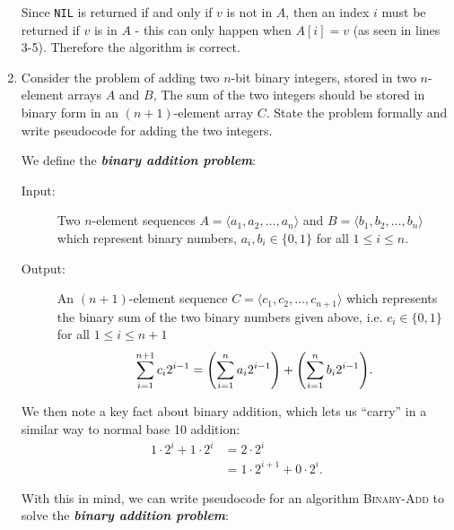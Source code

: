\documentclass[Chapter02]{subfiles}
\begin{document}
\begin{enumerate}
\begin{answer}
			Since \texttt{NIL} is returned if and only if $v$ is not in $A$, then an index $i$ must be returned if $v$ is in $A$ - this can only happen when $A[i] = v$ (as seen in lines 3-5). Therefore the algorithm is correct.
		\end{answer}

		\item Consider the problem of adding two $n$-bit binary integers, stored in two $n$-element arrays $A$ and $B$, The sum of the two integers should be stored in binary form in an $(n + 1)$-element array $C$. State the problem formally and write pseudocode for adding the two integers.
		\begin{answer}
			We define the \textbf{\textit{binary addition problem}}:
			\begin{description}
				\item[Input:] Two $n$-element sequences $A = \langle a_1, a_2, \dots, a_n \rangle$ and $B = \langle b_1, b_2, \dots, b_n \rangle$ which represent binary numbers, $a_i,b_i \in \{0, 1\}$ for all $1 \leq i \leq n$.

				\item[Output:] An $(n + 1)$-element sequence $C = \langle c_1, c_2, \dots, c_{n + 1} \rangle$ which represents the binary sum of the two binary numbers given above, i.e. $c_i \in \{0, 1\}$ for all $1 \leq i \leq n + 1$
				\[
					\sum_{i = 1}^{n + 1} c_i2^{i - 1} = \qty(\sum_{i = 1}^{n} a_i2^{i - 1}) + \qty(\sum_{i = 1}^{n} b_i2^{i - 1}).
				\]
			\end{description}

			We then note a key fact about binary addition, which lets us ``carry'' in a similar way to normal base 10 addition:
			\begin{align}
				1\cdot2^i + 1\cdot2^i &= 2\cdot2^i \nonumber\\
				                      &= 1\cdot2^{i + 1} + 0\cdot2^i. \label{eq:ch02-binary-add-carry}
			\end{align}

			With this in mind, we can write pseudocode for an algorithm \textsc{Binary-Add} to solve the \textbf{\textit{binary addition problem}}:

			\begin{algorithm}[H]

			\end{algorithm}


\end{answer}
\end{enumerate}
\end{document}
